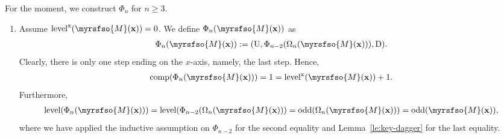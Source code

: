 \documentclass[12pt,reqno]{amsart}
\numberwithin{equation}{section}
\theoremstyle{theorem}
\theoremstyle{definition}
\theoremstyle{named}
\newcommand{\odd}{\operatorname{odd}}
\newcommand{\comp}{\operatorname{comp}}
\newcommand{\level}{\operatorname{level}}
\newcommand{\x}{\operatorname{x}}
\newcommand{\cM}{\myrsfso{M}}
\newcommand{\bfx}{\mathbf{x}}
\newcommand{\rU}{\mathrm{U}}
\newcommand{\rD}{\mathrm{D}}
\begin{document}
For the moment, we construct $\Phi_n$ for $n\ge 3$.

\begin{enumerate}[label={\textup{(\arabic{*})}}, leftmargin=*, labelsep=5pt, align=left, itemsep=2pt, topsep=2pt, parsep=2pt]
	\item Assume $\level^{\x}(\cM(\bfx)) = 0$. We define $\Phi_n(\cM(\bfx))$ as
	\begin{align*}
		\Phi_n(\cM(\bfx)) := (\rU, \Phi_{n-2}(\Omega_n(\cM(\bfx))), \rD).
	\end{align*}
	Clearly, there is only one step ending on the $x$-axis, namely, the last step. Hence,
	\begin{align*}
		\comp(\Phi_n(\cM(\bfx))) = 1 = \level^{\x}(\cM(\bfx)) + 1.
	\end{align*}
	Furthermore,
	\begin{align*}
		\level(\Phi_n(\cM(\bfx))) = \level(\Phi_{n-2}(\Omega_n(\cM(\bfx))) = \odd(\Omega_n(\cM(\bfx))) = \odd(\cM(\bfx)),
	\end{align*}
	where we have applied the inductive assumption on $\Phi_{n-2}$ for the second equality and Lemma~\ref{le:key-dagger} for the last equality.
	

\end{enumerate}
\end{document}
